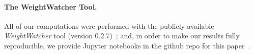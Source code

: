 \paragraph{The WeightWatcher Tool.}

All of our computations were performed with the publicly-available \emph{WeightWatcher} tool (version 0.2.7)~\cite{weightwatcher_package};
and, in order to make our results fully reproducible, we provide Jupyter notebooks in the github repo for this paper~\cite{repo}.



